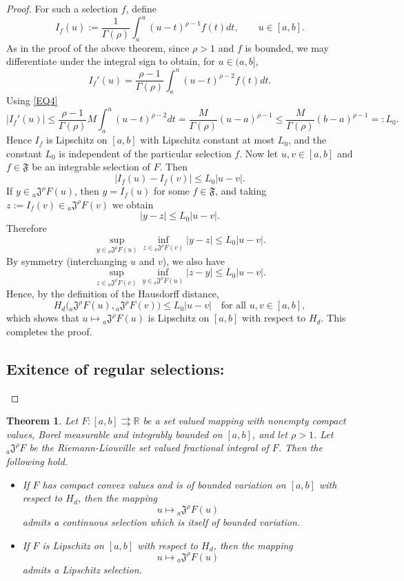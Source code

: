 \documentclass[a4paper,12pt,reqno]{amsart}
\numberwithin{equation}{section}
\newtheorem{theorem}{Theorem}[section]
\theoremstyle{definition}
\theoremstyle{remark}
\numberwithin{equation}{section}
\begin{document}
\begin{proof}
For such a selection $f$, define
$$
I_f(u):=\frac{1}{\Gamma(\rho)}\int_{a}^{u}(u-t)^{\rho-1}f(t)dt,
\qquad u\in[a,b].
$$
As in the proof of the above theorem,  since $\rho>1$ and $f$ is bounded, we may differentiate under the integral sign to obtain, for
$u\in(a,b]$,
$$
I_f'(u)
=
\frac{\rho-1}{\Gamma(\rho)}
\int_{a}^{u}(u-t)^{\rho-2}f(t)dt.
$$
Using \eqref{EQ4}
$$|I_f'(u)|
\le
\frac{\rho-1}{\Gamma(\rho)}M\int_{a}^{u}(u-t)^{\rho-2}dt
=
\frac{M}{\Gamma(\rho)}(u-a)^{\rho-1}
\le
\frac{M}{\Gamma(\rho)}(b-a)^{\rho-1}
=:L_0.$$
Hence $I_f$ is Lipschitz on $[a,b]$ with Lipschitz constant at most $L_0$, and the constant $L_0$ is independent of the particular selection $f$.
Now let $u,v\in[a,b]$ and $f\in\mathfrak{F}$ be an integrable selection of
$F$. Then
\[
|I_f(u)-I_f(v)|\le L_0|u-v|.
\]
If $y\in {}_{a}\mathfrak{J}^{\rho}F(u)$, then $y=I_f(u)$ for some
$f\in\mathfrak{F}$, and taking $z:=I_f(v)\in{}_{a}\mathfrak{J}^{\rho}F(v)$
we obtain
\[
|y-z|\le L_0|u-v|.
\]
Therefore
\[
\sup_{y\in {}_{a}\mathfrak{J}^{\rho}F(u)}
\inf_{z\in {}_{a}\mathfrak{J}^{\rho}F(v)}|y-z|
\le L_0|u-v|.
\]
By symmetry (interchanging $u$ and $v$), we also have
\[
\sup_{z\in {}_{a}\mathfrak{J}^{\rho}F(v)}
\inf_{y\in {}_{a}\mathfrak{J}^{\rho}F(u)}|z-y|
\le L_0|u-v|.
\]
Hence, by the definition of the Hausdorff distance,
\[
H_d\big({}_{a}\mathfrak{J}^{\rho}F(u),
        {}_{a}\mathfrak{J}^{\rho}F(v)\big)
\le L_0|u-v|
\quad\text{for all }u,v\in[a,b],
\]
which shows that $u\mapsto{}_{a}\mathfrak{J}^{\rho}F(u)$ is Lipschitz on $[a,b]$ with respect to $H_d$. This completes the proof.
\subsection*{Exitence of regular selections:}
\end{proof}
\begin{theorem} \label{Maintheorem}
    Let $F:[a,b]\rightrightarrows\mathbb{R}$ be a set valued mapping with nonempty
compact values, Borel measurable and integrably bounded on $[a,b]$, and let
$\rho>1$. Let ${}_{a}\mathfrak{J}^{\rho}F$ be the Riemann-Liouville set valued fractional integral of $F$. Then the following hold.
    \begin{itemize}
        \item[(a)] If $F$ has compact convex values and is of bounded variation on $[a,b]$ with respect to $H_d$, then the mapping
$$ u \longmapsto {}_{a}\mathfrak{J}^{\rho}F(u)$$ admits a continuous selection which is itself of bounded variation.
        \item[(b)] If $F$ is Lipschitz on $[a,b]$ with respect to $H_d$, then the mapping
$$ u \longmapsto {}_{a}\mathfrak{J}^{\rho}F(u)$$ admits a Lipschitz selection.
    \end{itemize}
\end{theorem}
\end{document}
